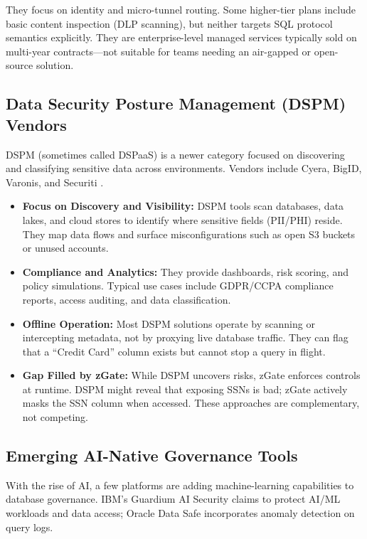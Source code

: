 They focus on identity and micro-tunnel routing. Some higher-tier plans include basic content inspection (DLP scanning), but neither targets SQL protocol semantics explicitly. They are enterprise-level managed services typically sold on multi-year contracts---not suitable for teams needing an air-gapped or open-source solution.

\subsection{Data Security Posture Management (DSPM) Vendors}

DSPM (sometimes called DSPaaS) is a newer category focused on discovering and classifying sensitive data across environments. Vendors include Cyera, BigID, Varonis, and Securiti \cite{paloalto-dspm}.

\begin{itemize}
  \item \textbf{Focus on Discovery and Visibility:} DSPM tools scan databases, data lakes, and cloud stores to identify where sensitive fields (PII/PHI) reside. They map data flows and surface misconfigurations such as open S3 buckets or unused accounts.
  \item \textbf{Compliance and Analytics:} They provide dashboards, risk scoring, and policy simulations. Typical use cases include GDPR/CCPA compliance reports, access auditing, and data classification.
  \item \textbf{Offline Operation:} Most DSPM solutions operate by scanning or intercepting metadata, not by proxying live database traffic. They can flag that a ``Credit Card'' column exists but cannot stop a query in flight.
  \item \textbf{Gap Filled by zGate:} While DSPM uncovers risks, zGate enforces controls at runtime. DSPM might reveal that exposing SSNs is bad; zGate actively masks the SSN column when accessed. These approaches are complementary, not competing.
\end{itemize}

\subsection{Emerging AI-Native Governance Tools}

With the rise of AI, a few platforms are adding machine-learning capabilities to database governance. IBM's Guardium AI Security claims to protect AI/ML workloads and data access; Oracle Data Safe incorporates anomaly detection on query logs.

